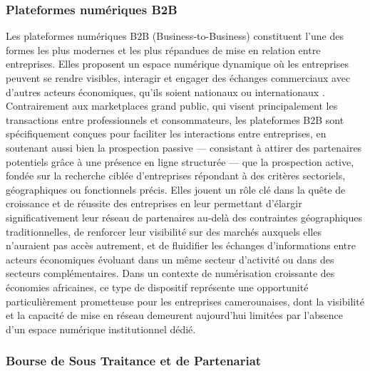 \documentclass[12pt, a4paper, oneside]{report}
\begin{document}
	\subsubsection{Plateformes numériques B2B}
	Les plateformes numériques B2B (Business-to-Business) constituent l'une des formes les plus modernes et les plus répandues de mise en relation entre entreprises. Elles proposent un espace numérique dynamique où les entreprises peuvent se rendre visibles, interagir et engager des échanges commerciaux avec d'autres acteurs économiques, qu'ils soient nationaux ou internationaux \cite{acceor2024}. Contrairement aux marketplaces grand public, qui visent principalement les transactions entre professionnels et consommateurs, les plateformes B2B sont spécifiquement conçues pour faciliter les interactions entre entreprises, en soutenant aussi bien la prospection passive — consistant à attirer des partenaires potentiels grâce à une présence en ligne structurée — que la prospection active, fondée sur la recherche ciblée d'entreprises répondant à des critères sectoriels, géographiques ou fonctionnels précis. Elles jouent un rôle clé dans la quête de croissance et de réussite des entreprises en leur permettant d'élargir significativement leur réseau de partenaires au-delà des contraintes géographiques traditionnelles, de renforcer leur visibilité sur des marchés auxquels elles n'auraient pas accès autrement, et de fluidifier les échanges d'informations entre acteurs économiques évoluant dans un même secteur d'activité ou dans des secteurs complémentaires. Dans un contexte de numérisation croissante des économies africaines, ce type de dispositif représente une opportunité particulièrement prometteuse pour les entreprises camerounaises, dont la visibilité et la capacité de mise en réseau demeurent aujourd'hui limitées par l'absence d'un espace numérique institutionnel dédié.
	\subsubsection{Bourse de Sous Traitance et de Partenariat}
	
\end{document}
